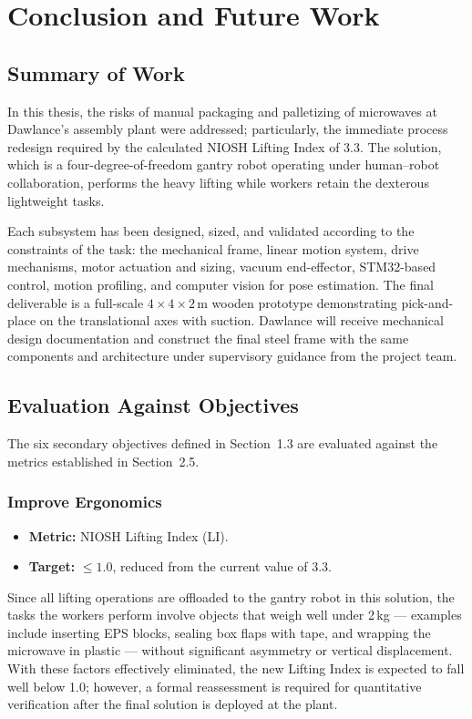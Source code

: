 \chapter{Conclusion and Future Work}

\section{Summary of Work}

In this thesis, the risks of manual packaging and palletizing of microwaves at Dawlance's assembly plant were addressed; particularly, the immediate process redesign required by the calculated NIOSH Lifting Index of 3.3. The solution, which is a four-degree-of-freedom gantry robot operating under human--robot collaboration, performs the heavy lifting while workers retain the dexterous lightweight tasks.

Each subsystem has been designed, sized, and validated according to the constraints of the task: the mechanical frame, linear motion system, drive mechanisms, motor actuation and sizing, vacuum end-effector, STM32-based control, motion profiling, and computer vision for pose estimation. The final deliverable is a full-scale $4 \times 4 \times 2$\,m wooden prototype demonstrating pick-and-place on the translational axes with suction. Dawlance will receive mechanical design documentation and construct the final steel frame with the same components and architecture under supervisory guidance from the project team.

\section{Evaluation Against Objectives}

The six secondary objectives defined in Section~1.3 are evaluated against the metrics established in Section~2.5.

\subsection{Improve Ergonomics}

\begin{itemize}
    \item \textbf{Metric:} NIOSH Lifting Index (LI).
    \item \textbf{Target:} $\leq 1.0$, reduced from the current value of 3.3.
\end{itemize}

Since all lifting operations are offloaded to the gantry robot in this solution, the tasks the workers perform involve objects that weigh well under 2\,kg --- examples include inserting EPS blocks, sealing box flaps with tape, and wrapping the microwave in plastic --- without significant asymmetry or vertical displacement. With these factors effectively eliminated, the new Lifting Index is expected to fall well below 1.0; however, a formal reassessment is required for quantitative verification after the final solution is deployed at the plant.

